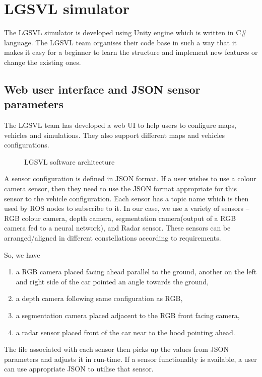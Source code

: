 \section{LGSVL simulator}
The LGSVL simulator is developed using Unity engine which is written in C\# language.
The LGSVL team organises their code base\cite{lgsvlgithub} in such a way that it makes it
easy for a beginner to learn the structure and implement new features or change the
existing ones.
\subsection{Web user interface and JSON sensor parameters}
The LGSVL team has developed a web UI to help users to configure maps, vehicles and
simulations. They also support different maps and vehicles configurations.
\begin{wrapfigure}{l}{0.7\textwidth}
	\centering
    \def\svgwidth{0.7\textwidth}
    \caption{LGSVL software architecture}
    \label{fig:lgsvlswarchitecture}
\end{wrapfigure}
A sensor configuration is defined in JSON format. If a user wishes to use a colour camera
sensor, then they need to use the JSON format appropriate for this sensor to the vehicle
configuration. Each sensor has a topic name which is then used by ROS nodes to subscribe
to it. In our case, we use a variety of sensors -- RGB colour camera, depth camera,
segmentation camera(output of a RGB camera fed to a neural network), and Radar sensor.
These sensors can be arranged/aligned in different constellations according to
requirements.

So, we have

\begin{enumerate}

    \item a RGB camera placed facing ahead parallel to the ground, another on
the left and right side of the car pointed an angle towards the ground,
    \item a depth camera following same configuration as RGB,
    \item a segmentation camera placed adjacent to the RGB front facing camera,
    \item a radar sensor placed front of the car near to the hood pointing ahead.
\end{enumerate}

The file associated with each sensor then picks up the values from JSON parameters and adjusts it in
run-time. If a sensor functionality is available, a user can use appropriate JSON to
utilise that sensor.

